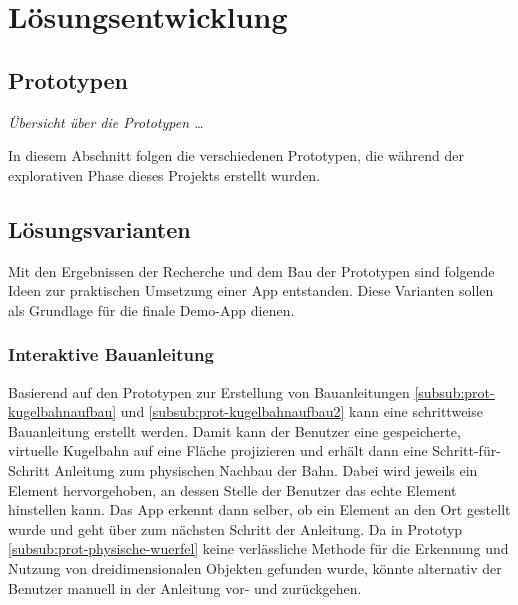 \section{Lösungsentwicklung}

\subsection{Prototypen}
\textit{Übersicht über die Prototypen …} %

In diesem Abschnitt folgen die verschiedenen Prototypen, die während der explorativen Phase dieses Projekts erstellt wurden.









\subsection{Lösungsvarianten}\label{sub:loesungsvarianten}

Mit den Ergebnissen der Recherche und dem Bau der Prototypen sind folgende Ideen zur praktischen Umsetzung einer App entstanden.
Diese Varianten sollen als Grundlage für die finale Demo-App dienen.

\subsubsection{Interaktive Bauanleitung}\label{subsub:loesung-bauanleitung}

Basierend auf den Prototypen zur Erstellung von Bauanleitungen \ref{subsub:prot-kugelbahnaufbau} und \ref{subsub:prot-kugelbahnaufbau2} kann eine schrittweise Bauanleitung erstellt werden.
Damit kann der Benutzer eine gespeicherte, virtuelle Kugelbahn auf eine Fläche projizieren und erhält dann eine Schritt-für-Schritt Anleitung zum physischen Nachbau der Bahn.
Dabei wird jeweils ein Element hervorgehoben, an dessen Stelle der Benutzer das echte Element hinstellen kann.
Das App erkennt dann selber, ob ein Element an den Ort gestellt wurde und geht über zum nächsten Schritt der Anleitung.
Da in Prototyp \ref{subsub:prot-physische-wuerfel} keine verlässliche Methode für die Erkennung und Nutzung von dreidimensionalen Objekten gefunden wurde, könnte alternativ der Benutzer manuell in der Anleitung vor- und zurückgehen.

